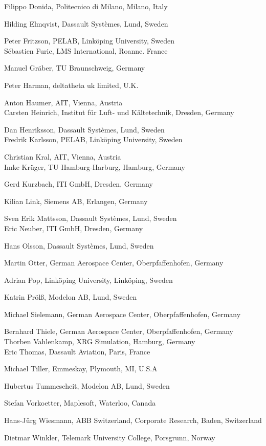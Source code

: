 \documentclass[10pt,a4paper]{report}
\begin{document}
Filippo Donida, Politecnico di Milano, Milano, Italy

Hilding Elmqvist, Dassault Systèmes, Lund, Sweden

Peter Fritzson, PELAB, Linköping University, Sweden\\
Sébastien Furic, LMS International, Roanne. France

Manuel Gräber, TU Braunschweig, Germany

Peter Harman, deltatheta uk limited, U.K.

Anton Haumer, AIT, Vienna, Austria\\
Carsten Heinrich, Institut für Luft- und Kältetechnik, Dresden, Germany

Dan Henriksson, Dassault Systèmes, Lund, Sweden\\
Fredrik Karlsson, PELAB, Linköping University, Sweden

Christian Kral, AIT, Vienna, Austria\\
Imke Krüger, TU Hamburg-Harburg, Hamburg, Germany

Gerd Kurzbach, ITI GmbH, Dresden, Germany

Kilian Link, Siemens AB, Erlangen, Germany

Sven Erik Mattsson, Dassault Systèmes, Lund, Sweden\\
Eric Neuber, ITI GmbH, Dresden, Germany

Hans Olsson, Dassault Systèmes, Lund, Sweden

Martin Otter, German Aerospace Center, Oberpfaffenhofen, Germany

Adrian Pop, Linköping University, Linköping, Sweden

Katrin Prölß, Modelon AB, Lund, Sweden

Michael Sielemann, German Aerospace Center, Oberpfaffenhofen, Germany

Bernhard Thiele, German Aerospace Center, Oberpfaffenhofen, Germany\\
Thorben Vahlenkamp, XRG Simulation, Hamburg, Germany\\
Eric Thomas, Dassault Aviation, Paris, France

Michael Tiller, Emmeskay, Plymouth, MI, U.S.A

Hubertus Tummescheit, Modelon AB, Lund, Sweden

Stefan Vorkoetter, Maplesoft, Waterloo, Canada

Hans-Jürg Wiesmann, ABB Switzerland, Corporate Research, Baden,
Switzerland

Dietmar Winkler, Telemark University College, Porsgrunn, Norway
\end{document}
